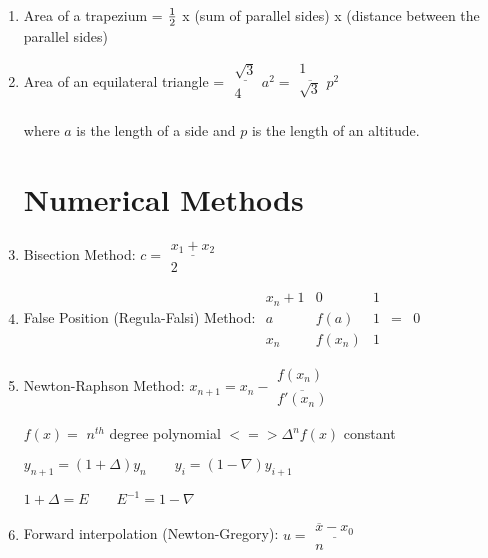 \documentclass[a4paper]{article}
\begin{document}
\begin{enumerate}
\item
Area of a trapezium = $\frac{1}{2}$ x (sum of parallel sides) x (distance between the parallel sides)

\item
Area of an equilateral triangle = 
$\begin{array}{c}
\underline{\sqrt 3} \\
4 \\
\end{array}
a^2=
\begin{array}{c}
1 \\
\overline{\sqrt 3} \\
\end{array} p^2$

where $a$ is the length of a side and $p$ is the length of an altitude.

\section{Numerical Methods}

\item Bisection Method:
$c=\begin{array}{c}
\underline{x_1+x_2} \\
2\end{array}
$

\item False Position (Regula-Falsi) Method:
$\begin{array}{|ccc|cc}
x_n+1 & 0      & 1 & & \\
a     & f(a)   & 1 & = & 0 \\
x_n   & f(x_n) & 1 & &
\end{array}$

\item Newton-Raphson Method:
$x_{n+1} = x_n -
\begin{array}{c}
f(x_n) \\
\overline{f'(x_n)}
\end{array}$

$f(x) = $ $n^{th}$ degree polynomial $<=> \Delta^nf(x)$ constant

$y_{n+1}=(1+\Delta)y_n \qquad y_i=(1-\nabla)y_{i+1}$

$1+\Delta=E \qquad E^{-1}=1-\nabla$

\item Forward interpolation (Newton-Gregory):
$u=
\begin{array}{c}
\underline{\overline{x} - x_0} \\
n
\end{array}$


\end{enumerate}
\end{document}
